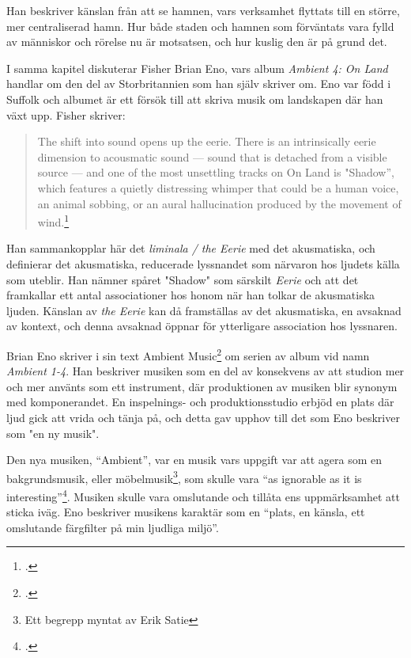 \documentclass{article}
\begin{document}
Han beskriver känslan från att se hamnen, vars verksamhet flyttats till en större, mer centraliserad hamn. 
Hur både staden och hamnen som förväntats vara fylld av människor och rörelse nu är motsatsen, och hur kuslig
den är på grund det.

I samma kapitel diskuterar Fisher Brian Eno, vars album \emph{Ambient 4: On Land} handlar om den del av
Storbritannien som han själv skriver om. Eno var född i Suffolk och albumet är ett försök till att skriva
musik om landskapen där han växt upp. Fisher skriver: 

\begin{quote}
The shift into sound opens up the eerie. There is an intrinsically eerie dimension to acousmatic sound — sound
that is detached from a visible source — and one of the most unsettling tracks on On Land is "Shadow”, which
features a quietly distressing whimper that could be a human voice, an animal sobbing, or an aural
	hallucination produced by the movement of wind.\footcite[81]{Fisher}
\end{quote}

Han sammankopplar här det \emph{liminala / the Eerie} med det akusmatiska, och definierar det akusmatiska,
reducerade lyssnandet som närvaron hos ljudets källa som uteblir. Han nämner spåret "Shadow" som särskilt
\emph{Eerie} och att det framkallar ett antal associationer hos honom när han tolkar de akusmatiska ljuden.
Känslan av \emph{the Eerie} kan då framställas av det akusmatiska, en avsaknad av kontext, och denna avsaknad
öppnar för ytterligare association hos lyssnaren.

Brian Eno skriver i sin text Ambient Music\footcite[149-153]{Eno} om serien av album vid namn \emph{Ambient 1-4}. Han
beskriver musiken som en del av konsekvens av att studion mer och mer använts som ett instrument, där
produktionen av musiken blir synonym med komponerandet. En inspelnings- och produktionsstudio erbjöd en plats
där ljud gick att vrida och tänja på, och detta gav upphov till det som Eno beskriver som "en ny musik".

Den nya musiken, ``Ambient'', var en musik vars uppgift var att agera som en bakgrundsmusik, eller
möbelmusik\footnote{Ett begrepp myntat av Erik Satie}, som skulle vara ``as ignorable as it is
interesting''\footcite{Airports}. Musiken skulle vara omslutande och tillåta ens uppmärksamhet att sticka iväg.
Eno beskriver musikens karaktär som en ``plats, en känsla, ett omslutande färgfilter på min ljudliga miljö''. 
\end{document}
